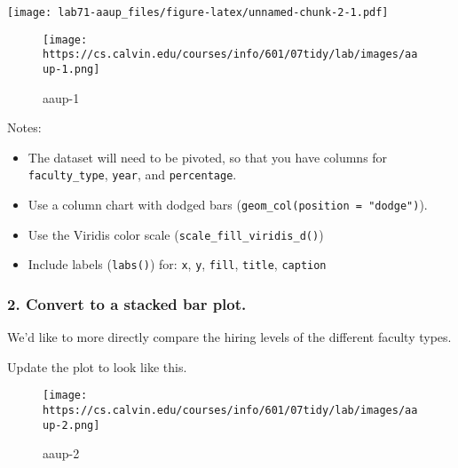 \documentclass[
]{article}
\providecommand{\tightlist}{%
  \setlength{\itemsep}{0pt}\setlength{\parskip}{0pt}}
\begin{document}
\texttt{[image: lab71-aaup\_files/figure-latex/unnamed-chunk-2-1.pdf]}

\begin{figure}
\centering
\texttt{[image: https://cs.calvin.edu/courses/info/601/07tidy/lab/images/aaup-1.png]}
\caption{aaup-1}
\end{figure}

Notes:

\begin{itemize}
\tightlist
\item
  The dataset will need to be pivoted, so that you have columns for
  \texttt{faculty\_type}, \texttt{year}, and \texttt{percentage}.
\item
  Use a column chart with dodged bars
  (\texttt{geom\_col(position\ =\ "dodge")}).
\item
  Use the Viridis color scale (\texttt{scale\_fill\_viridis\_d()})
\item
  Include labels (\texttt{labs()}) for: \texttt{x}, \texttt{y},
  \texttt{fill}, \texttt{title}, \texttt{caption}
\end{itemize}

\hypertarget{convert-to-a-stacked-bar-plot.}{%
\subsubsection{2. Convert to a stacked bar
plot.}\label{convert-to-a-stacked-bar-plot.}}

We'd like to more directly compare the hiring levels of the different
faculty types.

Update the plot to look like this.

\begin{figure}
\centering
\texttt{[image: https://cs.calvin.edu/courses/info/601/07tidy/lab/images/aaup-2.png]}
\caption{aaup-2}
\end{figure}
\end{document}
